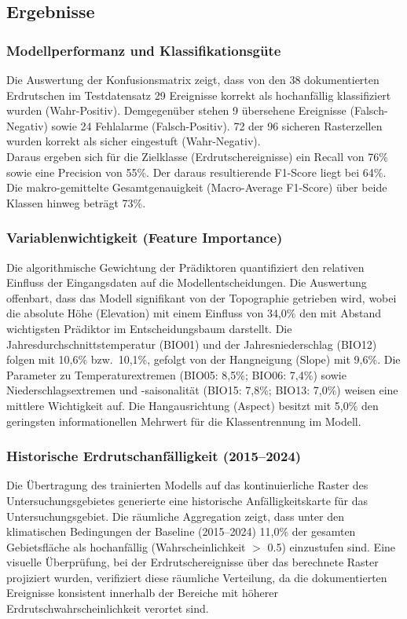 \documentclass[../main.tex]{subfiles}
\begin{document}
\subsection{Ergebnisse}

\subsubsection{Modellperformanz und Klassifikationsgüte}
Die Auswertung der Konfusionsmatrix zeigt, dass von den 38 dokumentierten Erdrutschen im Testdatensatz 29 Ereignisse korrekt als hochanfällig klassifiziert wurden (Wahr-Positiv).
Demgegenüber stehen 9 übersehene Ereignisse (Falsch-Negativ) sowie 24 Fehlalarme (Falsch-Positiv).
72 der 96 sicheren Rasterzellen wurden korrekt als sicher eingestuft (Wahr-Negativ). \\

Daraus ergeben sich für die Zielklasse (Erdrutschereignisse) ein Recall von 76\% sowie eine Precision von 55\%. Der daraus resultierende F1-Score liegt bei 64\%.
Die makro-gemittelte Gesamtgenauigkeit (Macro-Average F1-Score) über beide Klassen hinweg beträgt 73\%.

\subsubsection{Variablenwichtigkeit (Feature Importance)}
Die algorithmische Gewichtung der Prädiktoren quantifiziert den relativen Einfluss der Eingangsdaten auf die Modellentscheidungen. Die Auswertung offenbart, dass das Modell signifikant von der Topographie getrieben wird, wobei die absolute Höhe (Elevation) mit einem Einfluss von 34,0\% den mit Abstand wichtigsten Prädiktor im Entscheidungsbaum darstellt.
Die Jahresdurchschnittstemperatur (BIO01) und der Jahresniederschlag (BIO12) folgen mit 10,6\% bzw.\ 10,1\%, gefolgt von der Hangneigung (Slope) mit 9,6\%.
Die Parameter zu Temperaturextremen (BIO05: 8,5\%; BIO06: 7,4\%) sowie Niederschlagsextremen und -saisonalität (BIO15: 7,8\%; BIO13: 7,0\%) weisen eine mittlere Wichtigkeit auf.
Die Hangausrichtung (Aspect) besitzt mit 5,0\% den geringsten informationellen Mehrwert für die Klassentrennung im Modell.

\subsubsection{Historische Erdrutschanfälligkeit (2015--2024)}
Die Übertragung des trainierten Modells auf das kontinuierliche Raster des Untersuchungsgebietes generierte eine historische Anfälligkeitskarte für das Untersuchungsgebiet. Die räumliche Aggregation zeigt, dass unter den klimatischen Bedingungen der Baseline (2015--2024) 11,0\% der gesamten Gebietsfläche als hochanfällig (Wahrscheinlichkeit $>$ 0.5) einzustufen sind.
Eine visuelle Überprüfung, bei der Erdrutschereignisse über das berechnete Raster projiziert wurden, verifiziert diese räumliche Verteilung, da die dokumentierten Ereignisse konsistent innerhalb der Bereiche mit höherer Erdrutschwahrscheinlichkeit verortet sind.
\end{document}
